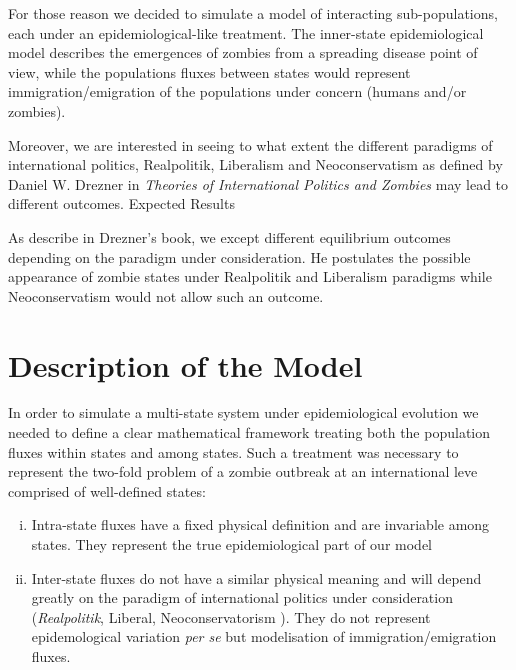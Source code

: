 \documentclass[11pt]{article} %
\begin{document}
For those reason we decided to simulate a model of interacting sub-populations, each under an epidemiological-like treatment. The inner-state epidemiological model describes the emergences of zombies from a spreading disease point of view, while the populations fluxes between states would represent immigration/emigration of the populations under concern (humans and/or zombies). 

Moreover, we are interested in seeing to what extent the different paradigms of international politics, Realpolitik, Liberalism and Neoconservatism as defined by Daniel W. Drezner in \textit{Theories of International Politics and Zombies} \cite{drezner} may lead to different outcomes.
Expected Results

As describe in Drezner's book, we except different equilibrium outcomes depending on the paradigm under consideration. He postulates the possible appearance of zombie states under Realpolitik and Liberalism paradigms while Neoconservatism would not allow such an outcome.








\newpage
\section{Description of the Model}\indent

In order to simulate a multi-state system under epidemiological evolution we needed to define a clear mathematical framework treating both the population fluxes within states and among states. Such a treatment was necessary to represent the two-fold problem of a zombie outbreak at an international leve comprised of well-defined states:
\begin{enumerate}[i.]
	\item Intra-state fluxes have a fixed physical definition and are invariable among states. They represent the true epidemiological part of our model
	\item Inter-state fluxes do not have a similar physical meaning and will depend greatly on the paradigm of international politics under consideration (\textit{Realpolitik}, Liberal, Neoconservatorism  \cite{drezner}). They do not represent epidemological variation \textit{per se} but modelisation of immigration/emigration fluxes.
\end{enumerate}
\end{document}
